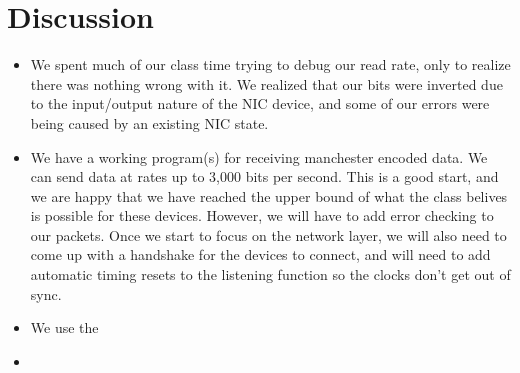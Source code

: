 \documentclass{article}
\begin{document}
\section*{Discussion}
\begin{itemize}
    \item We spent much of our class time trying to debug our read rate, only to realize there was nothing wrong with it. We realized
    that our bits were inverted due to the input/output nature of the NIC device, and some of our errors were being caused by an existing NIC state.
    \item We have a working program(s) for receiving manchester encoded data. We can send data at rates up to 3,000 bits per second. 
    This is a good start, and we are happy that we have reached the upper bound of what the class belives is possible for these devices.
    However, we will have to add error checking to our packets. Once we start to focus on the network layer, we will also need to come up with a 
    handshake for the devices to connect, and will need to add automatic timing resets to the listening function so the clocks don't get out of sync. 
    \item We use the 
    \item 
\end{itemize}

\end{document}
